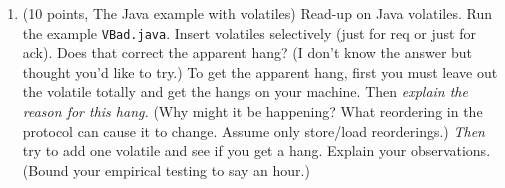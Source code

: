 \documentclass[11pt]{article}
\begin{document}
\begin{enumerate}
\item (10 points, The Java example with volatiles)
  Read-up on Java volatiles. Run the example \verb|VBad.java|.
  Insert volatiles selectively (just for req or just for ack).
  Does that correct the apparent hang? (I don't know the answer
  but thought you'd like to try.) To get the apparent hang,
  first you must leave out the volatile totally and get the
  hangs on your machine.
  Then {\em explain the reason for this hang.} (Why might it be
  happening? What reordering in the protocol can cause it to
  change. Assume only store/load reorderings.\footnotemark)
  {\em Then} try to add one volatile
  and see if you get a hang. Explain your observations. (Bound
  your empirical testing to say an hour.)

  \begin{minipage}{\minpagw}
  \end{minipage}



\end{enumerate}
\end{document}
